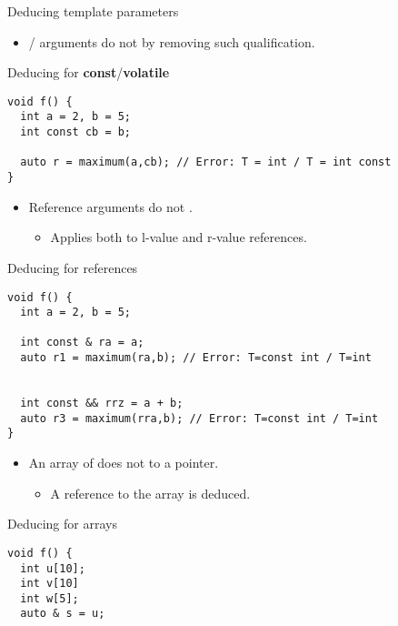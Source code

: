 \begin{frame}{Deducing template parameters}

\begin{itemize}
  \item {}/ arguments do not 
        by removing such qualification.
\end{itemize}

\begin{block}{Deducing for \textbf{const}/\textbf{volatile}}
\begin{lstlisting}
void f() {
  int a = 2, b = 5;
  int const cb = b;

  auto r = maximum(a,cb); // Error: T = int / T = int const
}
\end{lstlisting}
\end{block}

\framebreak

\begin{itemize}
  \item Reference arguments do not .
    \begin{itemize}
      \item Applies both to l-value and r-value references.
    \end{itemize}
\end{itemize}

\begin{block}{Deducing for references}
\begin{lstlisting}
void f() {
  int a = 2, b = 5;

  int const & ra = a;
  auto r1 = maximum(ra,b); // Error: T=const int / T=int


  int const && rrz = a + b;
  auto r3 = maximum(rra,b); // Error: T=const int / T=int
}

\end{lstlisting}
\end{block}

\framebreak

\begin{itemize}
  \item An array of  does not  to a pointer.
    \begin{itemize}
      \item A reference to the array is deduced.
    \end{itemize}
\end{itemize}

\begin{block}{Deducing for arrays}
\begin{lstlisting}
void f() {
  int u[10];
  int v[10]
  int w[5];
  auto & s = u;


\end{lstlisting}
\end{block}
\end{frame}
